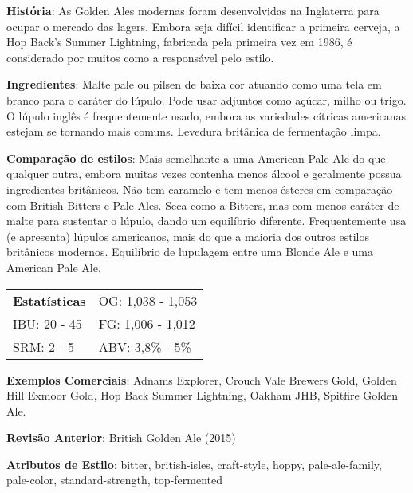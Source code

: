 \textbf{História}: As Golden Ales modernas foram desenvolvidas na Inglaterra para ocupar o mercado das lagers. Embora seja difícil identificar a primeira cerveja, a Hop Back's Summer Lightning, fabricada pela primeira vez em 1986, é considerado por muitos como a responsável pelo estilo.

\textbf{Ingredientes}: Malte pale ou pilsen de baixa cor atuando como uma tela em branco para o caráter do lúpulo. Pode usar adjuntos como açúcar, milho ou trigo. O lúpulo inglês é frequentemente usado, embora as variedades cítricas americanas estejam se tornando mais comuns. Levedura britânica de fermentação limpa.

\textbf{Comparação de estilos}: Mais semelhante a uma American Pale Ale do que qualquer outra, embora muitas vezes contenha menos álcool e geralmente possua ingredientes britânicos. Não tem caramelo e tem menos ésteres em comparação com British Bitters e Pale Ales. Seca como a Bitters, mas com menos caráter de malte para sustentar o lúpulo, dando um equilíbrio diferente. Frequentemente usa (e apresenta) lúpulos americanos, mais do que a maioria dos outros estilos britânicos modernos. Equilíbrio de lupulagem entre uma Blonde Ale e uma American Pale Ale.

\begin{tabular}{@{}p{35mm}p{35mm}@{}}
  \textbf{Estatísticas} & OG: 1,038 - 1,053 \\
  IBU: 20 - 45  & FG: 1,006 - 1,012  \\
  SRM: 2 - 5  & ABV: 3,8\% - 5\%
\end{tabular}

\textbf{Exemplos Comerciais}: Adnams Explorer, Crouch Vale Brewers Gold, Golden Hill Exmoor Gold, Hop Back Summer Lightning, Oakham JHB, Spitfire Golden Ale.

\textbf{Revisão Anterior}: British Golden Ale (2015)

\textbf{Atributos de Estilo}: bitter, british-isles, craft-style, hoppy, pale-ale-family, pale-color, standard-strength, top-fermented
